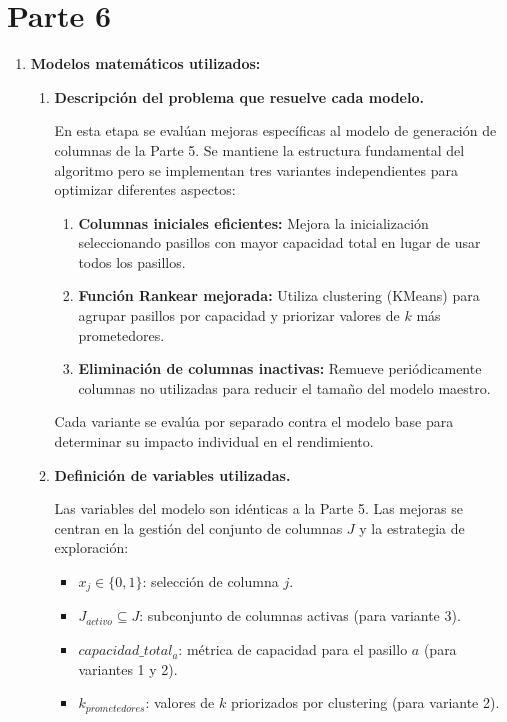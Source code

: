 \documentclass[a4paper,12pt]{article}
\begin{document}
\clearpage

\section{Parte 6}

\begin{enumerate}[label=(\alph*), leftmargin=2em]
    \item \textbf{Modelos matemáticos utilizados:}
    \begin{enumerate}[label=\roman*., leftmargin=0.2em]
    
        \item \textbf{Descripción del problema que resuelve cada modelo.}
        
            En esta etapa se evalúan mejoras específicas al modelo de generación de columnas de la Parte 5. Se mantiene la estructura fundamental del algoritmo pero se implementan tres variantes independientes para optimizar diferentes aspectos:

            \begin{enumerate}[label=\arabic*.]
                \item \textbf{Columnas iniciales eficientes:} Mejora la inicialización seleccionando pasillos con mayor capacidad total en lugar de usar todos los pasillos.
                \item \textbf{Función Rankear mejorada:} Utiliza clustering (KMeans) para agrupar pasillos por capacidad y priorizar valores de $k$ más prometedores.
                \item \textbf{Eliminación de columnas inactivas:} Remueve periódicamente columnas no utilizadas para reducir el tamaño del modelo maestro.
            \end{enumerate}

            Cada variante se evalúa por separado contra el modelo base para determinar su impacto individual en el rendimiento.

        \item \textbf{Definición de variables utilizadas.}

            Las variables del modelo son idénticas a la Parte 5. Las mejoras se centran en la gestión del conjunto de columnas $J$ y la estrategia de exploración:

            \begin{itemize}
                \item $x_j \in \{0,1\}$: selección de columna $j$.
                \item $J_{activo} \subseteq J$: subconjunto de columnas activas (para variante 3).
                \item $capacidad\_total_a$: métrica de capacidad para el pasillo $a$ (para variantes 1 y 2).
                \item $k_{prometedores}$: valores de $k$ priorizados por clustering (para variante 2).
            \end{itemize}


\end{enumerate}
\end{enumerate}
\end{document}
